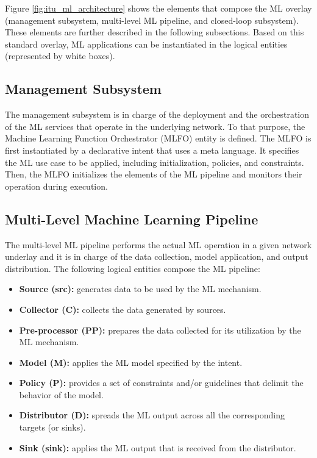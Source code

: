 \documentclass{article}
\begin{document}
Figure \ref{fig:itu_ml_architecture} shows the elements that compose the ML overlay (management subsystem, multi-level ML pipeline, and closed-loop subsystem). These elements are further described in the following subsections. Based on this standard overlay, ML applications can be instantiated in the logical entities (represented by white boxes).

\subsection{Management Subsystem} 
The management subsystem is in charge of the deployment and the orchestration of the ML services that operate in the underlying network. To that purpose, the Machine Learning Function Orchestrator (MLFO) entity is defined. The MLFO is first instantiated by a declarative intent that uses a meta language. It specifies the ML use case to be applied, including initialization, policies, and constraints. Then, the MLFO initializes the elements of the ML pipeline and monitors their operation during execution.

\subsection{Multi-Level Machine Learning Pipeline} 
The multi-level ML pipeline performs the actual ML operation in a given network underlay and it is in charge of the data collection, model application, and output distribution. The following logical entities compose the ML pipeline:
\begin{itemize}
	\item \textbf{Source (src):} generates data to be used by the ML mechanism.
	\item \textbf{Collector (C):} collects the data generated by sources.
	\item \textbf{Pre-processor (PP):} prepares the data collected for its utilization by the ML mechanism.
	\item \textbf{Model (M):} applies the ML model specified by the intent.
	\item \textbf{Policy (P):} provides a set of constraints and/or guidelines that delimit the behavior of the model.
	\item \textbf{Distributor (D):} spreads the ML output across all the corresponding targets (or sinks).
	\item \textbf{Sink (sink):} applies the ML output that is received from the distributor.
\end{itemize}
\end{document}
